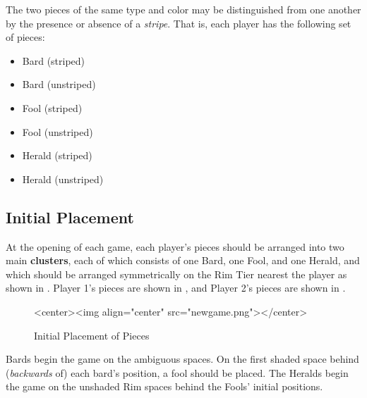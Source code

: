 The two pieces of the same type and color may be distinguished from
one another by the presence or absence of a {\sl stripe}.  That is,
each player has the following set of pieces:
\begin{itemize}
  \item Bard (striped)
  \item Bard (unstriped)
  \item Fool (striped)
  \item Fool (unstriped)
  \item Herald (striped)
  \item Herald (unstriped)
\end{itemize}

\subsection{Initial Placement}\label{iplacemt}

At the opening of each game, each player's pieces should be arranged into two
main {\bf clusters}, each of which consists of one Bard, one Fool,
and one Herald, and which should be arranged symmetrically on the Rim Tier
nearest the player as shown in 
.  Player 1's pieces
are shown in {\bf \acolor}, and Player 2's pieces are shown in
{\bf \bcolor}.

\begin{figure}
  \begin{makeimage}
  \end{makeimage}
  \begin{rawhtml}
    <center><img align="center" src="newgame.png"></center>
  \end{rawhtml}
  \caption{Initial Placement of Pieces}
  \label{iplace_fig}
\end{figure}

Bards begin the game on the ambiguous spaces.
On the first shaded space behind ({\sl backwards} of) each bard's
position, a fool should be placed.  The Heralds begin the game
on the unshaded Rim spaces behind the Fools' initial positions.


